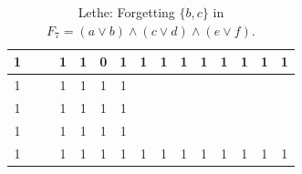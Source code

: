 \begin{table}[!tb]
\begin{tabular}{|c|c|c|c|c|c|c|c|c|c|c|c|c|c|c|}
        \rowcolor{yellow!40} 1 &  &  & 1 & 1 & 0 & 1 & 1 & 1 & 1 & 1 & 1 & 1 & 1 & 1 \\ \hline
        \rowcolor{gray!40} 1 &  &  & 1 & 1 & 1 & 1 &  &  &  &  &  &  &  &  \\ \hline
        \rowcolor{gray!40} 1 &  &  & 1 & 1 & 1 & 1 &  &  &  &  &  &  &  &  \\ \hline
        \rowcolor{gray!40} 1 &  &  & 1 & 1 & 1 & 1 &  &  &  &  &  &  &  &  \\ \hline
        \rowcolor{gray!40} 1 &  &  & 1 & 1 & 1 & 1 & 1 & 1 & 1 & 1 & 1 & 1 & 1 & 1 \\ \hline
    \end{tabular}
    \caption{Lethe: Forgetting $\{b, c\}$ in $F_{7} = (a \lor b) \land (c \lor d) \land (e \lor f)$.}
    \label{tab:lethe-F7-bc}
\end{table}
